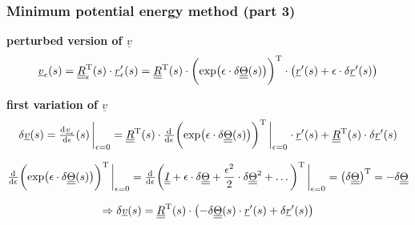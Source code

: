 \begin{frame}
  \frametitle{Minimum potential energy method (part 3)}
  \textbf{perturbed version of $\underline{v}$}
  \begin{displaymath}
    \underline{v}_{\epsilon}(s) =
    \underline{\underline{R}}_{\epsilon}^{\mathrm{T}}(s) \cdot \underline{r}_{\epsilon}^{\prime}(s) =
    \underline{\underline{R}}^{\mathrm{T}}(s) \cdot \biggl( \exp \bigl( \epsilon \cdot \delta \underline{\underline{\Theta}}(s) \bigr) \biggr)^{\mathrm{T}} \cdot \bigl( \underline{r}^{\prime}(s) + \epsilon \cdot \delta \underline{r}^{\prime}(s) \bigr)
  \end{displaymath}
  
  \vspace{0.5em}
  \textbf{first variation of $\underline{v}$}
  \begin{displaymath}
    \delta \underline{v}(s) = 
    \od{\underline{v}_{\epsilon}}{\epsilon}(s) \sVert[3]_{\epsilon=0} =
    \doubleunderline{R}^{\mathrm{T}}(s) \cdot
    \od{}{\epsilon} \biggl( \exp \bigl( \epsilon \cdot \delta \doubleunderline{\Theta}(s) \bigr) \biggr)^{\mathrm{T}} \sVert[3]_{\epsilon=0}
     \cdot \underline{r}^{\prime}(s) +
     \doubleunderline{R}^{\mathrm{T}}(s) \cdot \delta \underline{r}^{\prime}(s)
  \end{displaymath}
  
  \vspace{0.5em}
  \begin{displaymath}
    \od{}{\epsilon} \biggl( \exp \bigl( \epsilon \cdot \delta \doubleunderline{\Theta}(s) \bigr) \biggr)^{\mathrm{T}} \sVert[3]_{\epsilon=0} =
    \od{}{\epsilon} \biggl( \doubleunderline{I} + \epsilon \cdot \delta \doubleunderline{\Theta} + \frac{\epsilon^2}{2} \cdot \delta \doubleunderline{\Theta}^2 + \dots \biggr)^{\mathrm{T}} \sVert[3]_{\epsilon=0} =
    \bigl( \delta \doubleunderline{\Theta} \bigr)^{\mathrm{T}} = -\delta \doubleunderline{\Theta} 
  \end{displaymath}
  
  \vspace{0.5em}
  \begin{displaymath}
    \Rightarrow
    \delta \underline{v}(s) =
    \underline{\underline{R}}^{\mathrm{T}}(s) \cdot
    \bigl( - \delta \underline{\underline{\Theta}}(s) \cdot \underline{r}^{\prime}(s) + \delta \underline{r}^{\prime}(s) \bigr)
  \end{displaymath}
\end{frame}




